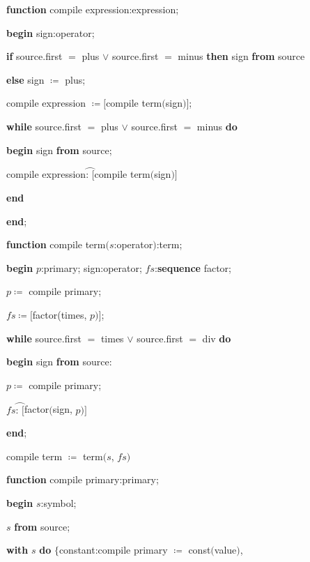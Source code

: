 \documentclass[twoside,11pt]{book}
\let\wideparen\overparen
\begin{document}
\noindent
\textbf{function} compile expression:expression;

\noindent
\quad \textbf{begin} sign:operator;

\noindent
\quad \quad \textbf{if} source.first $=$ plus $\vee$ source.first $=$ minus \textbf{then} sign \textbf{from} source

\noindent
\quad \quad \textbf{else} sign $\coloneq$ plus;

\noindent
\quad \quad compile expression $\coloneq [$compile term$($sign$)]$;

\noindent
\quad \quad \textbf{while} source.first $=$ plus $\vee$ source.first $=$ minus \textbf{do}

\noindent
\quad \quad \quad \textbf{begin} sign \textbf{from} source;

\noindent
\quad \quad \quad \quad compile expression$\wideparen{\text{:\ }[}$compile term$($sign$)]$

\noindent
\quad \quad \quad \textbf{end}

\noindent
\quad \textbf{end};

\noindent
\textbf{function} compile term$(s$:operator$)$:term;

\noindent
\quad \textbf{begin} $p$:primary; sign:operator; $fs$:\textbf{sequence} factor;

\noindent
\quad \quad $p\coloneq$ compile primary;

\noindent
\quad \quad $fs \coloneq [$factor(times, $p)]$;

\noindent
\quad \quad \textbf{while} source.first $=$ times $\vee$ source.first $=$ div \textbf{do}

\noindent
\quad \quad \quad \textbf{begin} sign \textbf{from} source:

\noindent
\quad \quad \quad \quad $p\coloneq$ compile primary;

\noindent
\quad \quad \quad \quad $fs\wideparen{\text{: }[}$factor$($sign, $p)]$

\noindent
\quad \quad \quad \textbf{end};

\noindent
\quad \quad compile term $\coloneq$ term$(s$, $fs)$

\noindent
\textbf{function} compile primary:primary;

\noindent
\quad \textbf{begin} $s$:symbol;

\noindent
\quad \quad $s$ \textbf{from} source;

\noindent
\quad \quad \textbf{with} $s$ \textbf{do} $\{$constant:compile primary $\coloneq$ const$($value$)$,
\end{document}
